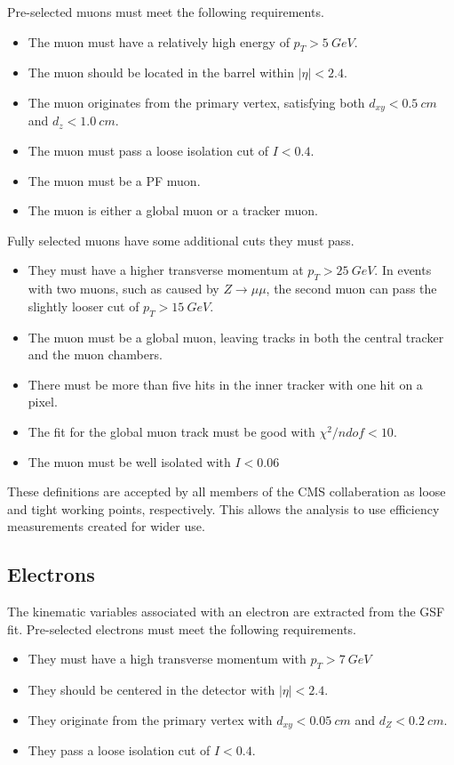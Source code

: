 Pre-selected muons must meet the following requirements.
\begin{itemize}
\item The muon must have a relatively high energy of $p_T > \SI{5}{GeV}$.
\item The muon should be located in the barrel within $|\eta| < 2.4$.
\item The muon originates from the primary vertex, satisfying both
  $d_{xy} < \SI{0.5}{cm}$ and $d_z < \SI{1.0}{cm}$.
\item The muon must pass a loose isolation cut of $I < 0.4$.
\item The muon must be a PF muon.
\item The muon is either a global muon or a tracker muon.
\end{itemize}

Fully selected muons have some additional cuts they must pass.
\begin{itemize}
\item They must have a higher transverse momentum at $p_T > \SI{25}{GeV}$.
  In events with two muons, such as caused by $Z \rightarrow \mu\mu$,
  the second muon can pass the slightly looser cut of $p_T > \SI{15}{GeV}$.
\item The muon must be a global muon, leaving tracks in both the central tracker
  and the muon chambers.
\item There must be more than five hits in the inner tracker with one hit on a pixel.
\item The fit for the global muon track must be good with $\chi^2/ndof < 10$.
\item The muon must be well isolated with $I < 0.06$
\end{itemize}

These definitions are accepted by all members of the CMS collaberation
as loose and tight working points, respectively.
This allows the analysis to use efficiency measurements created for wider use.

\subsection{Electrons}

The kinematic variables associated with an electron are extracted from the GSF fit.
Pre-selected electrons must meet the following requirements.
\begin{itemize}
\item They must have a high transverse momentum with $p_T > \SI{7}{GeV}$
\item They should be centered in the detector with $|\eta| < 2.4$.
\item They originate from the primary vertex with
  $d_{xy} < \SI{0.05}{cm}$ and $d_Z < \SI{0.2}{cm}$.
\item They pass a loose isolation cut of $I < 0.4$.
\end{itemize}

